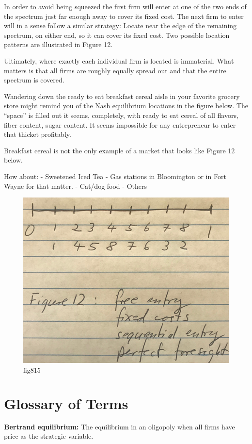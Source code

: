 \documentclass[
]{book}
\begin{document}
In order to avoid being squeezed the first firm will enter at one of the two ends of the spectrum just far enough away to cover its fixed cost. The next firm to enter will in a sense follow a similar strategy: Locate near the edge of the remaining spectrum, on either end, so it can cover its fixed cost. Two possible location patterns are illustrated in Figure 12.

Ultimately, where exactly each individual firm is located is immaterial. What matters is that all firms are roughly equally spread out and that the entire spectrum is covered.

Wandering down the ready to eat breakfast cereal aisle in your favorite grocery store might remind you of the Nash equilibrium locations in the figure below. The ``space'' is filled out it seems, completely, with ready to eat cereal of all flavors, fiber content, sugar content. It seems impossible for any entrepreneur to enter that thicket profitably.

Breakfast cereal is not the only example of a market that looks like Figure 12 below.

How about:
- Sweetened Iced Tea
- Gas stations in Bloomington or in Fort Wayne for that matter.
- Cat/dog food
- Others

\begin{figure}

{\centering \includegraphics[width=0.5\linewidth]{img/ch8/fig15} 

}

\caption{fig815}\label{fig:fig815}
\end{figure}

\hypertarget{glossary-of-terms-8}{%
\section{Glossary of Terms}\label{glossary-of-terms-8}}

\textbf{Bertrand equilibrium:} The equilibrium in an oligopoly when all firms have price as the strategic variable.
\end{document}
